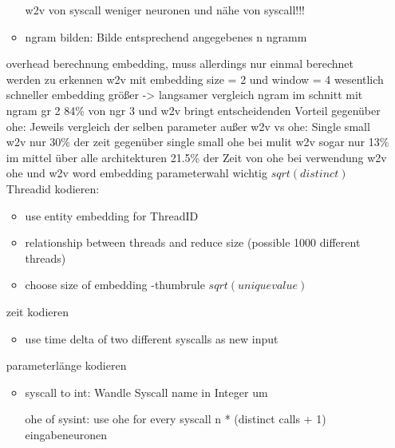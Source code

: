 \begin{itemize}
\begin{itemize}
                     w2v von syscall
                     weniger neuronen und nähe von syscall!!!
                    \item ngram bilden: Bilde entsprechend angegebenes n ngramm
                \end{itemize}
                overhead berechnung embedding, muss allerdings nur einmal berechnet werden
                zu erkennen w2v mit embedding size = 2  und window = 4 wesentlich schneller
                embedding größer -> langsamer
                vergleich ngram
                im schnitt mit ngram gr 2 84\% von ngr 3 und 
                w2v bringt entscheidenden Vorteil gegenüber ohe:
                Jeweils vergleich der selben parameter außer w2v vs ohe:
                Single small w2v nur 30\% der zeit gegenüber single small ohe
                bei mulit w2v sogar nur 13\%
                im mittel über alle architekturen 21.5\% der Zeit von ohe bei verwendung w2v
                ohe und w2v
                word embedding parameterwahl wichtig $sqrt(distinct)$
                Threadid kodieren: 
                \begin{itemize}
                    \item use entity embedding for ThreadID~\cite{GUO2016} 
                    \item relationship between threads and reduce size (possible 1000 different threads)
                    \item choose size of embedding -thumbrule $sqrt(unique value)$
                \end{itemize}
                zeit kodieren
                \begin{itemize}
                    \item use time delta of two different syscalls as new input
                \end{itemize}
                parameterlänge kodieren
                \begin{itemize}
                    \item syscall to int: Wandle Syscall name in Integer um

                     ohe of sysint: use ohe for every syscall 
                     n * (distinct calls + 1) eingabeneuronen 


\end{itemize}
\end{itemize}
